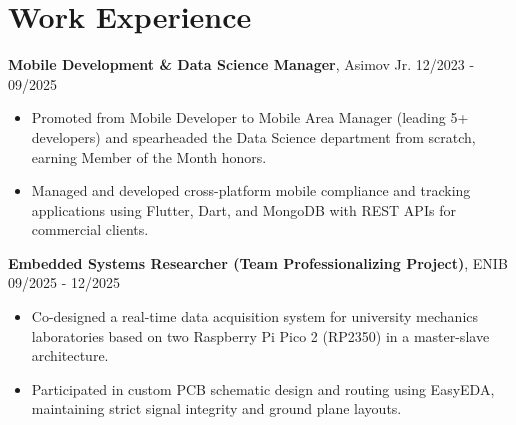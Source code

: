 \documentclass[10pt,a4paper]{article}
\begin{document}
\section{Work Experience}
\noindent
\textbf{\color{primary} Mobile Development \& Data Science Manager}, Asimov Jr. \hfill {\small\color{subtext} 12/2023 - 09/2025}
\begin{itemize}
    \item \small Promoted from Mobile Developer to Mobile Area Manager (leading 5+ developers) and spearheaded the Data Science department from scratch, earning Member of the Month honors.
    \item \small Managed and developed cross-platform mobile compliance and tracking applications using Flutter, Dart, and MongoDB with REST APIs for commercial clients.
\end{itemize}
\noindent
\textbf{\color{primary} Embedded Systems Researcher (Team Professionalizing Project)}, ENIB \hfill {\small\color{subtext} 09/2025 - 12/2025}
\begin{itemize}
    \item \small Co-designed a real-time data acquisition system for university mechanics laboratories based on two Raspberry Pi Pico 2 (RP2350) in a master-slave architecture.
    \item \small Participated in custom PCB schematic design and routing using EasyEDA, maintaining strict signal integrity and ground plane layouts.
\end{itemize}

\end{document}
